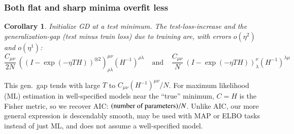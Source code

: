 \documentclass{article}
\theoremstyle{plain}
\newtheorem{cor}{Corollary}
\theoremstyle{definition}
\newcommand{\wrap}[1]{\left(#1\right)}
\newcommand{\rvalue}{\text{\textnormal{rvalue}}}
\newcommand{\sizeddia}[2]{
    \begin{gathered}
        \texttt{[image: ../diagrams/\#1.png]}
    \end{gathered}
}
\newcommand{\sdia}[1]{\protect \sizeddia{#1}{0.10}}
\begin{document}
        \subsubsection{Both flat and sharp minima overfit less} \label{subsect:curvature-and-overfitting}
    
            \begin{cor}\label{cor:overfit}
                Initialize GD at a test minimum.  The test-loss-increase and the
                generalization-gap (test minus train loss) due to training are,
                with errors $o(\eta^2)$ and $o(\eta^1)$:
                $$
                    \frac{C_{\mu\nu}}{2N} ~
                        \wrap{(I - \exp(-\eta T H))^{\otimes 2}}^{\mu\nu}_{\rho\lambda}
                        \wrap{H^{-1}}^{\rho\lambda}
                    ~~~~~ \text{and} ~~~~~
                    \frac{C_{\mu\nu}}{N} ~
                        \wrap{I - \exp(-\eta T H)}^{\nu}_{\lambda}
                        \wrap{H^{-1}}^{\lambda\mu}
                $$
            \end{cor}
            This gen.\ gap tends with large $T$ 
            to $C_{\mu\nu}(H^{-1})^{\mu\nu}/N$.  For maximum
            likelihood (ML) estimation in well-specified models near the ``true''
            minimum, $C=H$ is the Fisher metric, so we recover AIC:
            $(\textnormal{number of parameters})/N$.  Unlike AIC, our more general
            expression is descendably smooth, may be used with MAP or ELBO tasks
            instead of just ML, and does not assume a well-specified model.
    
\end{document}
